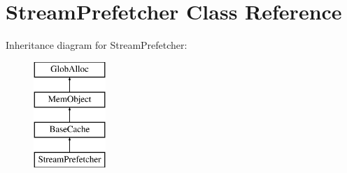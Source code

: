 \hypertarget{classStreamPrefetcher}{\section{Stream\-Prefetcher Class Reference}
\label{classStreamPrefetcher}
}
Inheritance diagram for Stream\-Prefetcher\-:\begin{figure}[H]
\begin{center}
\leavevmode
\includegraphics[height=4.000000cm]{classStreamPrefetcher}
\end{center}
\end{figure}
